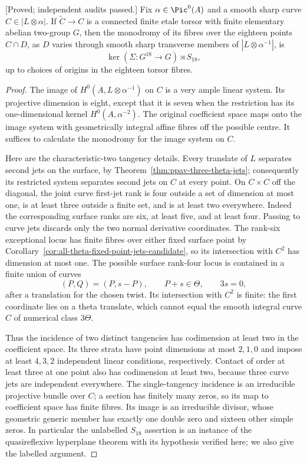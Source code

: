 \begin{lemma}
\label{lem:nonordinary-ppav-two-lifted-intersections-candidate}
\textup{[Proved; independent audits passed.]}
Fix $\alpha\in\Pic^0(A)$ and a smooth sharp curve
$C\in|L\otimes\alpha|$. If $\widetilde C\to C$ is a connected
finite etale torsor with finite elementary abelian two-group $G$,
then the monodromy of its fibres over the eighteen points $C\cap D$,
as $D$ varies through smooth sharp transverse members of
$|L\otimes\alpha^{-1}|$, is
\[
                 \ker(\Sigma:G^{18}\to G)\rtimes S_{18},
\]
up to choices of origins in the eighteen torsor fibres.
\end{lemma}
\begin{proof}
The image of $H^0(A,L\otimes\alpha^{-1})$ on $C$ is a very ample
linear system. Its projective dimension is eight, except that it
is seven when the restriction has its one-dimensional kernel
$H^0(A,\alpha^{-2})$. The original coefficient space maps onto
the image system with geometrically integral affine fibres off
the possible centre. It suffices to calculate the monodromy for
the image system on $C$.

Here are the characteristic-two tangency details. Every translate
of $L$ separates second jets on the surface, by
Theorem~\ref{thm:ppav-three-theta-jets}; consequently its restricted
system separates second jets on $C$ at every point. On $C\times C$
off the diagonal, the joint curve first-jet rank is four outside
a set of dimension at most one, is at least three outside a finite
set, and is at least two everywhere. Indeed the corresponding
surface ranks are six, at least five, and at least four. Passing
to curve jets discards only the two normal derivative coordinates.
The rank-six exceptional locus has finite fibres over either
fixed surface point by
Corollary~\ref{cor:all-theta-fixed-point-jets-candidate}, so its
intersection with $C^2$ has dimension at most one. The possible
surface rank-four locus is contained in a finite union of curves
\[
                 (P,Q)=(P,s-P),\qquad P+s\in\Theta,
                 \qquad 3s=0,
\]
after a translation for the chosen twist. Its intersection with
$C^2$ is finite: the first coordinate lies on a theta translate,
which cannot equal the smooth integral curve $C$ of numerical
class $3\Theta$.

Thus the incidence of two distinct tangencies has codimension at
least two in the coefficient space. Its three strata have point
dimensions at most $2,1,0$ and impose at least $4,3,2$ independent
linear conditions, respectively. Contact of order at least three
at one point also has codimension at least two, because three
curve jets are independent everywhere. The single-tangency
incidence is an irreducible projective bundle over $C$; a section
has finitely many zeros, so its map to coefficient space has finite
fibres. Its image is an irreducible divisor, whose geometric generic
member has exactly one double zero and sixteen other simple zeros.
In particular the unlabelled $S_{18}$ assertion is an instance of
the quasireflexive hyperplane theorem
\cite[Theorem~2 and Proposition~3.1]{Entin2021} with its hypothesis
verified here; we also give the labelled argument.


\end{proof}
